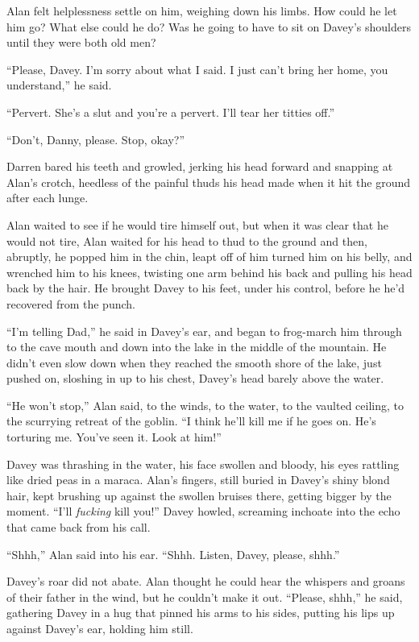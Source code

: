 \documentclass{article}
\begin{document}
Alan felt helplessness settle on him, weighing down his limbs.  How
could he let him go?  What else could he do?  Was he going to have to
sit on Davey's shoulders until they were both old men?

``Please, Davey.  I'm sorry about what I said.  I just can't bring her
home, you understand,'' he said.

``Pervert.  She's a slut and you're a pervert.  I'll tear her titties
off.''

``Don't, Danny, please.  Stop, okay?''

Darren bared his teeth and growled, jerking his head forward and
snapping at Alan's crotch, heedless of the painful thuds his head made
when it hit the ground after each lunge.

Alan waited to see if he would tire himself out, but when it was clear
that he would not tire, Alan waited for his head to thud to the ground
and then, abruptly, he popped him in the chin, leapt off of him turned
him on his belly, and wrenched him to his knees, twisting one arm
behind his back and pulling his head back by the hair.  He brought
Davey to his feet, under his control, before he he'd recovered from
the punch.

``I'm telling Dad,'' he said in Davey's ear, and began to frog-march
him through to the cave mouth and down into the lake in the middle of
the mountain.  He didn't even slow down when they reached the smooth
shore of the lake, just pushed on, sloshing in up to his chest,
Davey's head barely above the water.

``He won't stop,'' Alan said, to the winds, to the water, to the
vaulted ceiling, to the scurrying retreat of the goblin.  ``I think
he'll kill me if he goes on.  He's torturing me.  You've seen it. 
Look at him!''

Davey was thrashing in the water, his face swollen and bloody, his
eyes rattling like dried peas in a maraca.  Alan's fingers, still
buried in Davey's shiny blond hair, kept brushing up against the
swollen bruises there, getting bigger by the moment.  ``I'll
\textit{fucking} kill you!'' Davey howled, screaming inchoate into the
echo that came back from his call.

``Shhh,'' Alan said into his ear.  ``Shhh.  Listen, Davey, please,
shhh.''

Davey's roar did not abate.  Alan thought he could hear the whispers
and groans of their father in the wind, but he couldn't make it out. 
``Please, shhh,'' he said, gathering Davey in a hug that pinned his
arms to his sides, putting his lips up against Davey's ear, holding
him still.
\end{document}
